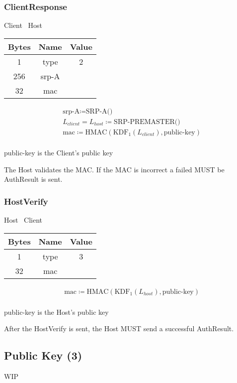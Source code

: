 \subsubsection{ClientResponse}

\begin{center}
    Client \textrightarrow\ Host\\
    \begin{tabular}{|c|c|c|}
        \hline
        \textbf{Bytes} & \textbf{Name} & \textbf{Value} \\
        \hline
        1              & type          & 2              \\
        \hline
        256            & srp-A         &                \\
        \hline
        32             & mac           &                \\
        \hline
    \end{tabular}
\end{center}

\begin{align*}
    & \text{srp-A} \coloneqq \text{SRP-A()}\\
    & L_{client} = L_{host} \coloneqq \text{SRP-PREMASTER()}\\
    & \text{mac} \coloneqq \text{HMAC}(\text{KDF}_1(L_{client}), \text{public-key})\\
\end{align*}

public-key is the Client's public key

The Host validates the MAC.
If the MAC is incorrect a failed MUST be AuthResult is sent.

\subsubsection{HostVerify}

\begin{center}
    Host \textrightarrow\ Client\\
    \begin{tabular}{|c|c|c|}
        \hline
        \textbf{Bytes} & \textbf{Name} & \textbf{Value} \\
        \hline
        1              & type          & 3              \\
        \hline
        32             & mac           &                \\
        \hline
    \end{tabular}
\end{center}

\begin{align*}
    & \text{mac} \coloneqq \text{HMAC}(\text{KDF}_1(L_{host}), \text{public-key})\\
\end{align*}

public-key is the Host's public key

After the HostVerify is sent, the Host MUST send a successful AuthResult.

\subsection{Public Key (3)}

WIP